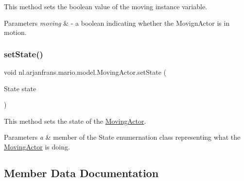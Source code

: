 This method sets the boolean value of the moving instance variable. 


\begin{DoxyParams}{Parameters}
{\em moving} & -\/ a boolean indicating whether the Movign\+Actor is in motion. \\
\hline
\end{DoxyParams}
\mbox{\label{classnl_1_1arjanfrans_1_1mario_1_1model_1_1MovingActor_a64188e7edb074bbf9e193a8ec5fa2ec2}} 
\subsubsection{\texorpdfstring{set\+State()}{setState()}}
{\footnotesize\ttfamily void nl.\+arjanfrans.\+mario.\+model.\+Moving\+Actor.\+set\+State (\begin{DoxyParamCaption}\item[{State}]{state }\end{DoxyParamCaption})}



This method sets the state of the \hyperlink{classnl_1_1arjanfrans_1_1mario_1_1model_1_1MovingActor}{Moving\+Actor}. 


\begin{DoxyParams}{Parameters}
{\em a} & member of the State enumernation class representing what the \hyperlink{classnl_1_1arjanfrans_1_1mario_1_1model_1_1MovingActor}{Moving\+Actor} is doing. \\
\hline
\end{DoxyParams}


\subsection{Member Data Documentation}
\mbox{\label{classnl_1_1arjanfrans_1_1mario_1_1model_1_1MovingActor_a4c472abc5e7932e72845bcc0d94a3e45}} 

